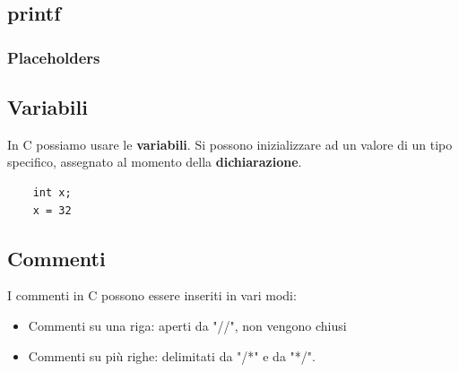 \documentclass[12pt,a4paper]{article}
\begin{document}
\subsection{printf}
\subsubsection{Placeholders}
\subsection{Variabili}
In C possiamo usare le \textbf{variabili}. Si possono inizializzare ad un valore di un tipo specifico, assegnato al momento della \textbf{dichiarazione}.
\begin{lstlisting}
    int x;
    x = 32
\end{lstlisting}
\subsection{Commenti}
I commenti in C possono essere inseriti in vari modi:
\begin{itemize}
    \item Commenti su una riga: aperti da "//", non vengono chiusi
    \item Commenti su più righe: delimitati da "/*" e da "*/".
\end{itemize}
\end{document}
